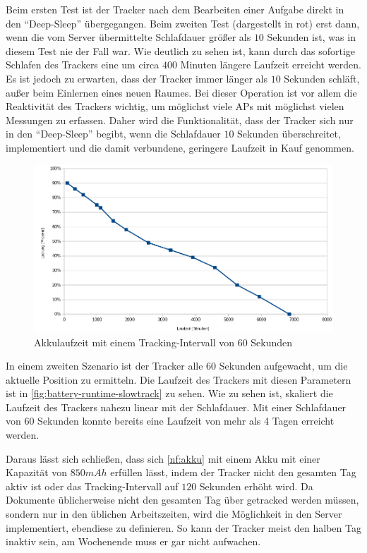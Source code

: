 Beim ersten Test ist der Tracker nach dem Bearbeiten einer Aufgabe direkt in den \enquote{Deep-Sleep}
übergegangen. Beim zweiten Test (dargestellt in rot) erst dann, wenn die vom Server übermittelte Schlafdauer größer als $10$
Sekunden ist, was in diesem Test nie der Fall war. Wie deutlich zu sehen ist, kann durch das
sofortige Schlafen des Trackers eine um circa $400$ Minuten längere Laufzeit erreicht werden. Es ist
jedoch zu erwarten, dass der Tracker immer länger als $10$ Sekunden schläft, außer beim Einlernen
eines neuen Raumes. Bei dieser Operation ist vor allem die Reaktivität des Trackers wichtig, um
möglichst viele \glspl{AP} mit möglichst vielen Messungen zu erfassen. Daher wird die
Funktionalität, dass der Tracker sich nur in den \enquote{Deep-Sleep} begibt, wenn die Schlafdauer
$10$ Sekunden überschreitet, implementiert und die damit verbundene, geringere Laufzeit in Kauf
genommen.

\begin{figure}[htbp]
	\centering
	\includegraphics[width=.9\textwidth]{images/battery-runtime-slowtrack2.png}
	\caption{Akkulaufzeit mit einem Tracking-Intervall von 60 Sekunden}
	\label{fig:battery-runtime-slowtrack}
\end{figure}

In einem zweiten Szenario ist der Tracker alle $60$ Sekunden aufgewacht, um die aktuelle Position
zu ermitteln. Die Laufzeit des Trackers mit diesen Parametern ist in
\autoref{fig:battery-runtime-slowtrack} zu sehen. Wie zu sehen ist, skaliert die Laufzeit des
Trackers nahezu linear mit der Schlafdauer. Mit einer Schlafdauer von $60$ Sekunden konnte bereits
eine Laufzeit von mehr als 4 Tagen erreicht werden.

Daraus lässt sich schließen, dass sich \ref*{nf:akku} mit einem \gls{Akku} mit einer Kapazität von $850
mAh$ erfüllen lässt, indem der Tracker nicht den gesamten Tag aktiv ist oder das Tracking-Intervall
auf $120$ Sekunden erhöht wird. Da Dokumente üblicherweise nicht den gesamten Tag über getracked
werden müssen, sondern nur in den üblichen Arbeitszeiten, wird die Möglichkeit in den Server
implementiert, ebendiese zu definieren. So kann der Tracker meist den halben Tag inaktiv sein, am
Wochenende muss er gar nicht aufwachen.

